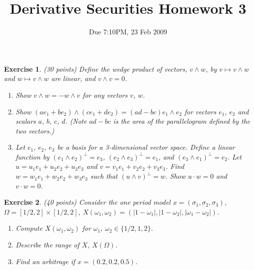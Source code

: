 \documentclass[11pt,fleqn]{amsproc}
\newtheorem{xca}{Exercise}
\begin{document}
\title{Derivative Securities Homework 3}
\author{Due 7:10PM, 23 Feb 2009}

\maketitle

\begin{xca}{(30 points)}
Define the wedge product of vectors, $v\wedge w$, by $v\mapsto v\wedge w$ and
$w\mapsto v\wedge w$ are linear, and $v\wedge v = 0$.
\begin{enumerate}
\item Show $v\wedge w = -w\wedge v$ for any vectors $v$, $w$.
\item Show $(a e_1 + b e_2)\wedge (c e_1 + d e_2) = (ad - bc)e_1\wedge e_2$ for
vectors $e_1$, $e_2$ and scalars $a$, $b$, $c$, $d$. (Note $ad - bc$ is the
area of the parallelogram defined by the two vectors.)
\item Let $e_1$, $e_2$, $e_3$ be a basis for a 3-dimensional vector space.
Define a linear function by $(e_1\wedge e_2)^\perp = e_3$, $(e_2\wedge e_3)^\perp = e_1$,
and $(e_3\wedge e_1)^\perp = e_2$. 
Let $u = u_1 e_1 + u_2 e_2 + u_3 e_3$ and $v = v_1 e_1 + v_2 e_2 + v_3 e_3$.
Find $w = w_1 e_1 + w_2 e_2 + w_3 e_3$ such that $(u\wedge v)^\perp = w$. Show $u\cdot w = 0$ and $v\cdot w = 0$.
\end{enumerate}
\end{xca}

\begin{xca}{(40 points)}
Consider the one period model $x = (\sigma_1, \sigma_2, \sigma_3)$, $\Omega = [1/2,2] \times [1/2, 2]$, $X(\omega_1, \omega_2)
= (|1 - \omega_1|, |1 - \omega_2|, |\omega_1 - \omega_2|)$.
\begin{enumerate}
\item Compute $X(\omega_1,\omega_2)$ for $\omega_1$, $\omega_2 \in \{1/2,1,2\}$.
\item Describe the range of $X$, $X(\Omega)$.
\item Find an arbitrage if $x = (0.2, 0.2, 0.5)$.
\end{enumerate}
\end{xca}
\end{document}
